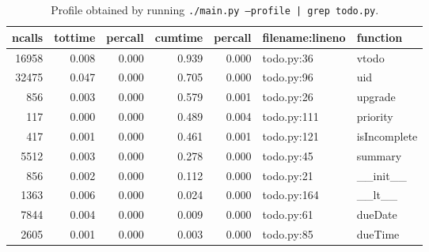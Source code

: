 \documentclass{prettytex/ox/mmsc-special-topic}
\begin{document}
  \begin{table}[H]
    \centering
    \caption{Profile obtained by running \texttt{./main.py --profile | grep todo.py}.}
    \begin{tabular}{rrrrrll}
      \hline
      ncalls & tottime & percall & cumtime & percall & filename:lineno & function     \\
      \hline
      16958  & 0.008   & 0.000   & 0.939   & 0.000   & todo.py:36      & vtodo        \\
      32475  & 0.047   & 0.000   & 0.705   & 0.000   & todo.py:96      & uid          \\
      856    & 0.003   & 0.000   & 0.579   & 0.001   & todo.py:26      & upgrade      \\
      117    & 0.000   & 0.000   & 0.489   & 0.004   & todo.py:111     & priority     \\
      417    & 0.001   & 0.000   & 0.461   & 0.001   & todo.py:121     & isIncomplete \\
      5512   & 0.003   & 0.000   & 0.278   & 0.000   & todo.py:45      & summary      \\
      856    & 0.002   & 0.000   & 0.112   & 0.000   & todo.py:21      & \_\_init\_\_ \\
      1363   & 0.006   & 0.000   & 0.024   & 0.000   & todo.py:164     & \_\_lt\_\_   \\
      7844   & 0.004   & 0.000   & 0.009   & 0.000   & todo.py:61      & dueDate      \\
      2605   & 0.001   & 0.000   & 0.003   & 0.000   & todo.py:85      & dueTime      \\
    \end{tabular}
    \label{table:paint-profile}
  \end{table}

  
\end{document}
